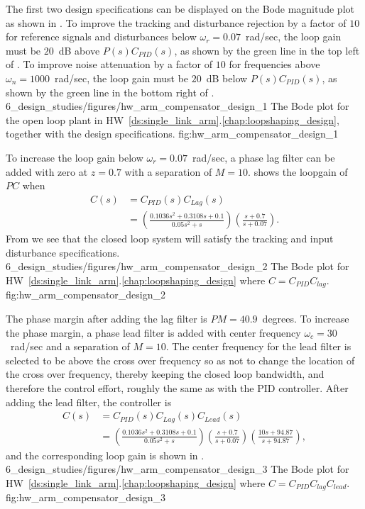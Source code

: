 
The first two design specifications can be displayed on the Bode magnitude plot as shown in .  To improve the tracking and disturbance rejection by a factor of $10$ for reference signals and disturbances below $\omega_r=0.07$~rad/sec, the loop gain must be $20$~dB above $P(s)C_{PID}(s)$, as shown by the green line in the top left of .
%
To improve noise attenuation by a factor of $10$ for frequencies above $\omega_n=1000$~rad/sec, the loop gain must be $20$~dB below $P(s)C_{PID}(s)$, as shown by the green line in the bottom right of .
%
	{6_design_studies/figures/hw_arm_compensator_design_1}
	{The Bode plot for the open loop plant in HW~\ref{ds:single_link_arm}.\ref{chap:loopshaping_design}, together with the design specifications.}
	{fig:hw_arm_compensator_design_1}

To increase the loop gain below $\omega_r=0.07$~rad/sec, a phase lag filter can be added with zero at $z=0.7$ with a separation of $M=10$.   shows the loopgain of $PC$ when 
\begin{align*}
C(s) &= C_{PID}(s)C_{Lag}(s) \\
     &=  \left(\frac{0.1036 s^2 + 0.3108 s + 0.1}{0.05 s^2 + s}\right)\left(\frac{s + 0.7}{s + 0.07}\right).
\end{align*}
From  we see that the closed loop system will satisfy the tracking and input disturbance specifications. 
	{6_design_studies/figures/hw_arm_compensator_design_2}
	{The Bode plot for HW~\ref{ds:single_link_arm}.\ref{chap:loopshaping_design} where $C=C_{PID}C_{lag}$.}
	{fig:hw_arm_compensator_design_2}

The phase margin after adding the lag filter is $PM=40.9$~degrees.  To increase the phase margin, a phase lead filter is added with center frequency $\omega_c=30$~rad/sec and a separation of $M=10$.  The center frequency for the lead filter is selected to be above the cross over frequency so as not to change the location of the cross over frequency, thereby keeping the closed loop bandwidth, and therefore the control effort, roughly the same as with the PID controller.  After adding the lead filter, the controller is
\begin{align*}
C(s) &= C_{PID}(s)C_{Lag}(s)C_{Lead}(s) \\
     &=  \left(\frac{0.1036 s^2 + 0.3108 s + 0.1}{0.05 s^2 + s}\right)\left(\frac{s + 0.7}{s + 0.07}\right)
	\left(\frac{10 s + 94.87}{s + 94.87}\right),
\end{align*}
and the corresponding loop gain is shown in .
	{6_design_studies/figures/hw_arm_compensator_design_3}
	{The Bode plot for HW~\ref{ds:single_link_arm}.\ref{chap:loopshaping_design} where $C=C_{PID}C_{lag}C_{lead}$.}
	{fig:hw_arm_compensator_design_3}

